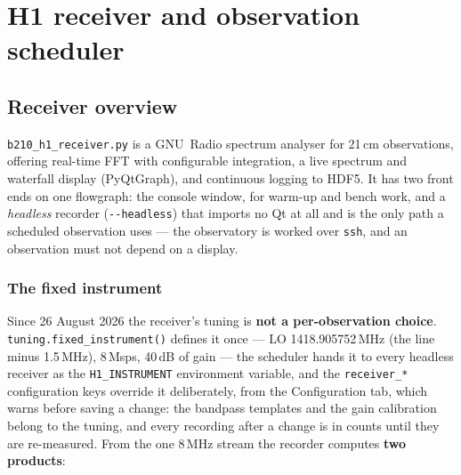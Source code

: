 \documentclass[11pt,a4paper]{article}
\begin{document}
\section{H1 receiver and observation scheduler}
\label{sec:receiver}

\subsection{Receiver overview}

\texttt{b210\_h1\_receiver.py} is a GNU~Radio spectrum analyser for 21\,cm observations, offering real-time FFT with configurable integration, a live spectrum and waterfall display (PyQtGraph), and continuous logging to HDF5. It has two front ends on one flowgraph: the console window, for warm-up and bench work, and a \emph{headless} recorder (\texttt{-{}-headless}) that imports no Qt at all and is the only path a scheduled observation uses --- the observatory is worked over \texttt{ssh}, and an observation must not depend on a display.

\subsubsection{The fixed instrument}
\label{sec:instrument}

Since 26 August 2026 the receiver's tuning is \textbf{not a per-observation choice}. \texttt{tuning.fixed\_instrument()} defines it once --- LO 1418.905752\,MHz (the line minus 1.5\,MHz), 8\,Msps, 40\,dB of gain --- the scheduler hands it to every headless receiver as the \texttt{H1\_INSTRUMENT} environment variable, and the \texttt{receiver\_*} configuration keys override it deliberately, from the Configuration tab, which warns before saving a change: the bandpass templates and the gain calibration belong to the tuning, and every recording after a change is in counts until they are re-measured. From the one 8\,MHz stream the recorder computes \textbf{two products}:
\end{document}
